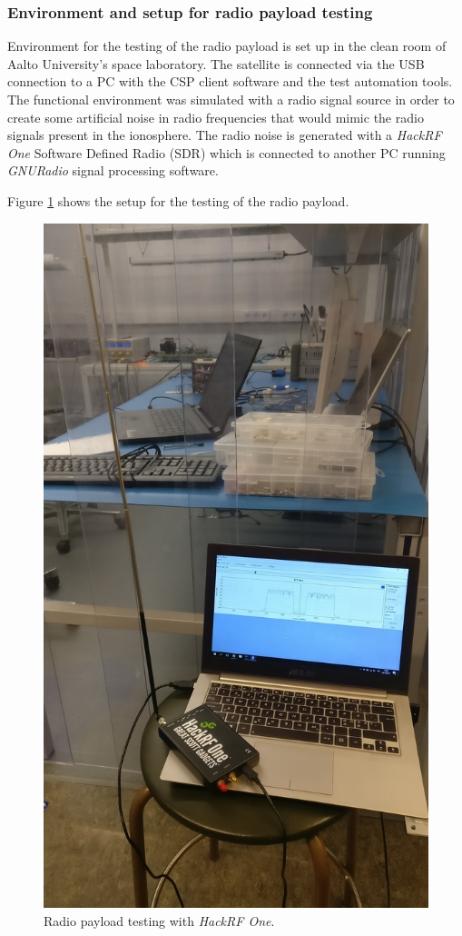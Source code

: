 \documentclass[english,12pt,a4paper,pdftex,elec,utf8]{aaltothesis}
\begin{document}
\subsubsection{Environment and setup for radio payload testing}
Environment for the testing of the radio payload is set up in the clean room of Aalto University's space laboratory. The satellite is connected via the USB connection to a PC with the CSP client software and the test automation tools. The functional environment was simulated with a radio signal source in order to create some artificial noise in radio frequencies that would mimic the radio signals present in the ionosphere. The radio noise is generated with a \textit{HackRF One} Software Defined Radio (SDR) which is connected to another PC running \textit{GNURadio} signal processing software.\par 
Figure \ref{s100hackrf} shows the setup for the testing of the radio payload.\par   
\begin{figure}[h!]
\centering
\includegraphics[scale=0.3]{payload_testing_hackrf}
\caption{Radio payload testing with \textit{HackRF One}.}
\label{s100hackrf}
\end{figure}
\end{document}
